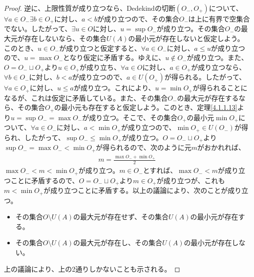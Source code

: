 \documentclass[dvipdfmx]{jsarticle}
\begin{document}
\begin{proof}
逆に、上限性質が成り立つなら、Dedekindの切断$\left( O_{-},O_{+} \right)$について、$\forall a \in O_{-}\exists b \in O_{+}$に対し、$a < b$が成り立つので、その集合$O_{-}$は上に有界で空集合でない。したがって、$\exists u \in O$に対し、$u = \sup O_{-}$が成り立つ。その集合$O_{-}$の最大元が存在しないなら、その集合$U(A)$の最小元が存在しないと仮定しよう。このとき、$u \in O_{-}$が成り立つと仮定すると、$\forall a \in O_{-}$に対し、$a \leq u$が成り立つので、$u = \max O_{-}$となり仮定に矛盾する。ゆえに、$u \notin O_{-}$が成り立つ。また、$O = O_{-} \sqcup O_{+}$より$u \in O_{+}$が成り立ち、$\forall a \in O$に対し、$a \in O_{+}$が成り立つなら、$\forall b \in O_{-}$に対し、$b < a$が成り立つので、$a \in U\left( O_{+} \right)$が得られる。したがって、$\forall a \in O_{+}$に対し、$u \leq a$が成り立つ。これにより、$u = \min O_{+}$が得られることになるが、これは仮定に矛盾している。また、その集合$O_{-}$の最大元が存在するなら、その集合$O_{+}$の最小元も存在すると仮定しよう。このとき、定理\ref{4.1.1.13}より$u = \sup O_{-} = \max O_{-}$が成り立つ。そこで、その集合$O_{+}$の最小元$\min O_{+}$について、$\forall a \in O_{-}$に対し、$a < \min O_{+}$が成り立つので、$\min O_{+} \in U\left( O_{-} \right)$が得られ、したがって、$\sup O_{-} \leq \min O_{+}$が成り立つ。$O = O_{-} \sqcup O_{+}$より$\sup O_{-} = \max O_{-} < \min O_{+}$が得られるので、次のように元$m$がおかれれば、
\begin{align*}
m = \frac{\max O_{-} + \min O_{+}}{2}
\end{align*}
$\max O_{-} < m < \min O_{+}$が成り立つ。$m \in O_{-}$とすれば、$\max O_{-} < m$が成り立つことに矛盾するので、$O = O_{-} \sqcup O_{+}$より$m \in O_{+}$が成り立つが、これも$m < \min O_{+}$が成り立つことに矛盾する。以上の議論により、次のことが成り立つ。
\begin{itemize}
\item
  その集合$O \setminus U(A)$の最大元が存在せず、その集合$U(A)$の最小元が存在する。
\item
  その集合$O \setminus U(A)$の最大元が存在し、その集合$U(A)$の最小元が存在しない。
\end{itemize}
上の議論により、上の2通りしかないことも示される。
\end{proof}
\end{document}

